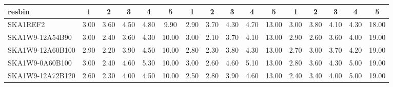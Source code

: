 \begin{table}[H]
{{\begin{tabular}{|lccccc||ccccc||ccccc|}
 resbin  &1 & 2 & 3 & 4 & 5 & 1 & 2 & 3 & 4 & 5 & 1 & 2 & 3 & 4 & 5 \\ \hline
SKA1REF2 & 3.00 \cellcolor{blue!60.00} & 3.60 \cellcolor{red!60.00} & 4.50 \cellcolor{green!55.80} & 4.80 \cellcolor{orange!39.00} & 9.90 \cellcolor{purple!18.00} & 2.90 \cellcolor{blue!53.00} & 3.70 \cellcolor{red!60.00} & 4.30 \cellcolor{green!46.00} & 4.70 \cellcolor{orange!43.20} & 13.00 \cellcolor{purple!18.00} & 3.00 \cellcolor{blue!60.00} & 3.80 \cellcolor{red!60.00} & 4.10 \cellcolor{green!48.00} & 4.30 \cellcolor{orange!26.40} & 18.00 \cellcolor{purple!18.00}\\ \hline 
SKA1W9-12A54B90 & 3.00 \cellcolor{blue!60.00} & 2.40 \cellcolor{red!24.00} & 3.60 \cellcolor{green!18.00} & 4.30 \cellcolor{orange!18.00} & 10.00 \cellcolor{purple!60.00} & 3.00 \cellcolor{blue!60.00} & 2.10 \cellcolor{red!18.00} & 3.70 \cellcolor{green!18.00} & 4.10 \cellcolor{orange!18.00} & 13.00 \cellcolor{purple!18.00} & 2.90 \cellcolor{blue!54.75} & 2.60 \cellcolor{red!18.00} & 3.60 \cellcolor{green!18.00} & 4.00 \cellcolor{orange!18.00} & 19.00 \cellcolor{purple!60.00}\\ \hline 
SKA1W9-12A60B100 & 2.90 \cellcolor{blue!53.00} & 2.20 \cellcolor{red!18.00} & 3.90 \cellcolor{green!30.60} & 4.50 \cellcolor{orange!26.40} & 10.00 \cellcolor{purple!60.00} & 2.80 \cellcolor{blue!46.00} & 2.30 \cellcolor{red!23.25} & 3.80 \cellcolor{green!22.67} & 4.30 \cellcolor{orange!26.40} & 13.00 \cellcolor{purple!18.00} & 2.70 \cellcolor{blue!44.25} & 3.00 \cellcolor{red!32.00} & 3.70 \cellcolor{green!24.00} & 4.20 \cellcolor{orange!23.60} & 19.00 \cellcolor{purple!60.00}\\ \hline 
SKA1W9-0A60B100 & 3.00 \cellcolor{blue!60.00} & 2.40 \cellcolor{red!24.00} & 4.60 \cellcolor{green!60.00} & 5.30 \cellcolor{orange!60.00} & 10.00 \cellcolor{purple!60.00} & 3.00 \cellcolor{blue!60.00} & 2.60 \cellcolor{red!31.12} & 4.60 \cellcolor{green!60.00} & 5.10 \cellcolor{orange!60.00} & 13.00 \cellcolor{purple!18.00} & 2.80 \cellcolor{blue!49.50} & 3.60 \cellcolor{red!53.00} & 4.30 \cellcolor{green!60.00} & 5.00 \cellcolor{orange!46.00} & 19.00 \cellcolor{purple!60.00}\\ \hline 
SKA1W9-12A72B120 & 2.60 \cellcolor{blue!32.00} & 2.30 \cellcolor{red!21.00} & 4.00 \cellcolor{green!34.80} & 4.50 \cellcolor{orange!26.40} & 10.00 \cellcolor{purple!60.00} & 2.50 \cellcolor{blue!25.00} & 2.80 \cellcolor{red!36.37} & 3.90 \cellcolor{green!27.33} & 4.60 \cellcolor{orange!39.00} & 13.00 \cellcolor{purple!18.00} & 2.40 \cellcolor{blue!28.50} & 3.40 \cellcolor{red!46.00} & 4.00 \cellcolor{green!42.00} & 5.00 \cellcolor{orange!46.00} & 19.00 \cellcolor{purple!60.00}\\ \hline 

\end{tabular}}}
\end{table}
